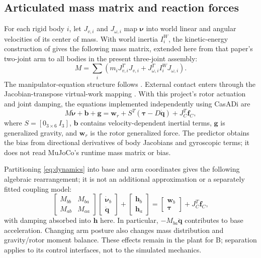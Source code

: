 \documentclass[conference]{IEEEtran}
\begin{document}
\subsection{Articulated mass matrix and reaction forces}
For each rigid body $i$, let $J_{v,i}$ and $J_{\omega,i}$ map $\boldsymbol\nu$ into world linear and angular velocities of its center of mass. With world inertia $I_i^W$, the kinetic-energy construction of \cite[Sec.~III-B, eqs.~(17)--(20)]{welde2020} gives the following mass matrix, extended here from that paper's two-joint arm to all bodies in the present three-joint assembly:
\begin{equation}
M=\sum_i\left(m_iJ_{v,i}^TJ_{v,i}+J_{\omega,i}^TI_i^WJ_{\omega,i}\right).
\label{eq:mass}
\end{equation}
The manipulator-equation structure follows \cite[Sec.~III-B, eq.~(8)]{welde2020}. External contact enters through the Jacobian-transpose virtual-work mapping \cite[Sec.~5.2 and ch.~8]{lynch2017}. With this project's rotor actuation and joint damping, the equations implemented independently using CasADi \cite{casadi} are
\begin{equation}
M\dot{\boldsymbol\nu}+\mathbf b+\mathbf g
=\mathbf w_r+S^T(\boldsymbol\tau-D\dot{\mathbf q})+J_C^T\mathbf f_C,
\label{eq:dynamics}
\end{equation}
where $S=[0_{3\times6}\ I_3]$, $\mathbf b$ contains velocity-dependent inertial terms, $\mathbf g$ is generalized gravity, and $\mathbf w_r$ is the rotor generalized force. The predictor obtains the bias from directional derivatives of body Jacobians and gyroscopic terms; it does not read MuJoCo's runtime mass matrix or bias.

Partitioning \eqref{eq:dynamics} into base and arm coordinates gives the following algebraic rearrangement; it is not an additional approximation or a separately fitted coupling model:
\begin{equation}
\begin{bmatrix}M_{bb}&M_{ba}\\M_{ab}&M_{aa}\end{bmatrix}
\begin{bmatrix}\dot{\boldsymbol\nu}_b\\\ddot{\mathbf q}\end{bmatrix}
+\begin{bmatrix}\mathbf h_b\\\mathbf h_a\end{bmatrix}
=\begin{bmatrix}\mathbf w_b\\\boldsymbol\tau\end{bmatrix}
+J_C^T\mathbf f_C,
\label{eq:blocks}
\end{equation}
with damping absorbed into $\mathbf h$ here. In particular, $-M_{ba}\ddot{\mathbf q}$ contributes to base acceleration. Changing arm posture also changes mass distribution and gravity/rotor moment balance. These effects remain in the plant for B; separation applies to its control interfaces, not to the simulated mechanics.
\end{document}
